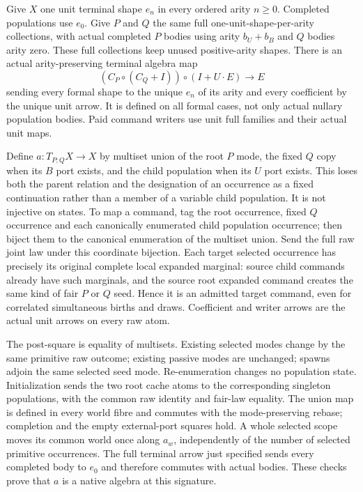 \documentclass[11pt]{article}\usepackage{amsmath,amssymb,geometry}\geometry{margin=1in}
\begin{document}
Give $X$ one unit terminal shape $e_n$ in every ordered arity $n\geq0$. Completed populations use $e_0$. Give $P$ and $Q$ the same full one-unit-shape-per-arity collections, with actual completed $P$ bodies using arity $b_U+b_B$ and $Q$ bodies arity zero. These full collections keep unused positive-arity shapes. There is an actual arity-preserving terminal algebra map
\[
 (C_P\circ(C_Q+I))\circ(I+U\cdot E)\longrightarrow E
\]
sending every formal shape to the unique $e_n$ of its arity and every coefficient by the unique unit arrow. It is defined on all formal cases, not only actual nullary population bodies. Paid command writers use unit full families and their actual unit maps.

Define $a:T_{P;Q}X\to X$ by multiset union of the root $P$ mode, the fixed $Q$ copy when its $B$ port exists, and the child population when its $U$ port exists. This loses both the parent relation and the designation of an occurrence as a fixed continuation rather than a member of a variable child population. It is not injective on states. To map a command, tag the root occurrence, fixed $Q$ occurrence and each canonically enumerated child population occurrence; then biject them to the canonical enumeration of the multiset union. Send the full raw joint law under this coordinate bijection. Each target selected occurrence has precisely its original complete local expanded marginal: source child commands already have such marginals, and the source root expanded command creates the same kind of fair $P$ or $Q$ seed. Hence it is an admitted target command, even for correlated simultaneous births and draws. Coefficient and writer arrows are the actual unit arrows on every raw atom.

The post-square is equality of multisets. Existing selected modes change by the same primitive raw outcome; existing passive modes are unchanged; spawns adjoin the same selected seed mode. Re-enumeration changes no population state. Initialization sends the two root cache atoms to the corresponding singleton populations, with the common raw identity and fair-law equality. The union map is defined in every world fibre and commutes with the mode-preserving rebase; completion and the empty external-port squares hold. A whole selected scope moves its common world once along $a_w$, independently of the number of selected primitive occurrences. The full terminal arrow just specified sends every completed body to $e_0$ and therefore commutes with actual bodies. These checks prove that $a$ is a native algebra at this signature.
\end{document}
